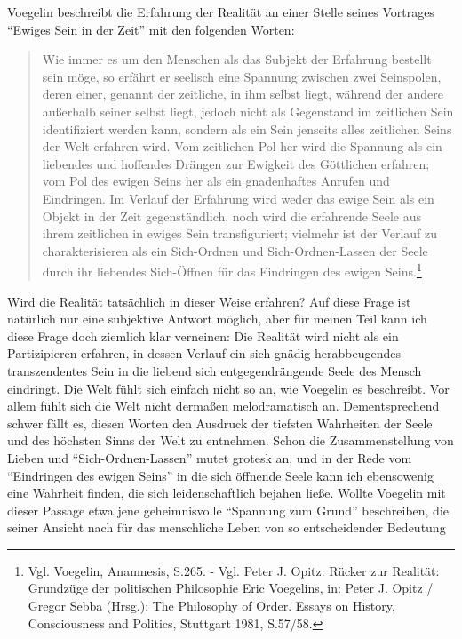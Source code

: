 Voegelin beschreibt die Erfahrung der Realität an einer Stelle seines
Vortrages "`Ewiges Sein in der Zeit"' mit den folgenden Worten:
 \begin{quote}
   Wie immer es um den Menschen als das Subjekt der Erfahrung bestellt sein
   möge, so erfährt er seelisch eine Spannung zwischen zwei Seinspolen, deren
   einer, genannt der zeitliche, in ihm selbst liegt, während der andere
   außerhalb seiner selbst liegt, jedoch nicht als Gegenstand im zeitlichen
   Sein identifiziert werden kann, sondern als ein Sein jenseits alles
   zeitlichen Seins der Welt erfahren wird. Vom zeitlichen Pol her wird die
   Spannung als ein liebendes und hoffendes Drängen zur Ewigkeit des
   Göttlichen erfahren; vom Pol des ewigen Seins her als ein gnadenhaftes
   Anrufen und Eindringen. Im Verlauf der Erfahrung wird weder das ewige Sein
   als ein Objekt in der Zeit gegenständlich, noch wird die erfahrende Seele
   aus ihrem zeitlichen in ewiges Sein transfiguriert; vielmehr ist der
   Verlauf zu charakterisieren als ein Sich-Ordnen und Sich-Ordnen-Lassen der
   Seele durch ihr liebendes Sich-Öffnen für das Eindringen des ewigen
   Seins.\footnote{Vgl. Voegelin, Anamnesis, S.265. - Vgl. Peter J. Opitz:
     Rücker zur Realität: Grundzüge der politischen Philosophie Eric
     Voegelins, in: Peter J.  Opitz / Gregor Sebba (Hrsg.): The Philosophy of
     Order. Essays on History, Consciousness and Politics, Stuttgart 1981,
     S.57/58.}
 \end{quote}
 Wird die Realität tatsächlich in dieser Weise erfahren? Auf diese Frage
 ist natürlich nur eine subjektive Antwort möglich, aber für meinen Teil
 kann ich diese Frage doch ziemlich klar verneinen: Die Realität wird
 nicht als ein Partizipieren erfahren, in dessen Verlauf ein sich gnädig
 herabbeugendes transzendentes Sein in die liebend sich
 entgegendrängende Seele des Mensch eindringt. Die Welt fühlt sich
 einfach nicht so an, wie Voegelin es beschreibt. Vor allem fühlt sich
 die Welt nicht dermaßen melodramatisch an.  Dementsprechend schwer
 fällt es, diesen Worten den Ausdruck der tiefsten Wahrheiten der Seele
 und des höchsten Sinns der Welt zu entnehmen. Schon die
 Zusammenstellung von Lieben und "`Sich-Ordnen-Lassen"' mutet grotesk
 an, und in der Rede vom "`Eindringen des ewigen Seins"' in die sich
 öffnende Seele kann ich ebensowenig eine Wahrheit finden, die sich
 leidenschaftlich bejahen ließe. Wollte Voegelin mit dieser Passage etwa
 jene geheimnisvolle "`Spannung zum Grund"' beschreiben, die seiner
 Ansicht nach für das menschliche Leben von so entscheidender Bedeutung
